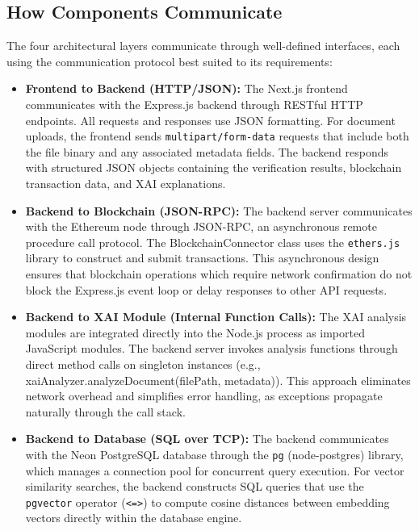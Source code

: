 \subsection{How Components Communicate}

The four architectural layers communicate through well-defined interfaces, each using the communication protocol best suited to its requirements:

\begin{itemize}
    \item \textbf{Frontend to Backend (HTTP/JSON):} The Next.js frontend communicates with the Express.js backend through RESTful HTTP endpoints. All requests and responses use JSON formatting. For document uploads, the frontend sends \texttt{multipart/form-data} requests that include both the file binary and any associated metadata fields. The backend responds with structured JSON objects containing the verification results, blockchain transaction data, and XAI explanations.
    
    \item \textbf{Backend to Blockchain (JSON-RPC):} The backend server communicates with the Ethereum node through JSON-RPC, an asynchronous remote procedure call protocol. The {BlockchainConnector} class uses the \texttt{ethers.js} library to construct and submit transactions. This asynchronous design ensures that blockchain operations which require network confirmation do not block the Express.js event loop or delay responses to other API requests.
    
    \item \textbf{Backend to XAI Module (Internal Function Calls):} The XAI analysis modules are integrated directly into the Node.js process as imported JavaScript modules. The backend server invokes analysis functions through direct method calls on singleton instances (e.g., {xaiAnalyzer.analyzeDocument(filePath, metadata)}). This approach eliminates network overhead and simplifies error handling, as exceptions propagate naturally through the call stack.
    
    \item \textbf{Backend to Database (SQL over TCP):} The backend communicates with the Neon PostgreSQL database through the \texttt{pg} (node-postgres) library, which manages a connection pool for concurrent query execution. For vector similarity searches, the backend constructs SQL queries that use the \texttt{pgvector} operator (\texttt{<=>}) to compute cosine distances between embedding vectors directly within the database engine.
\end{itemize}

